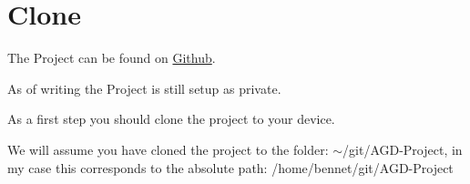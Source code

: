 \section{Clone}
	The Project can be found on \href{https://github.com/BB20101997/AGD-Project}{Github}.
	
	As of writing the Project is still setup as private.
	
	As a first step you should clone the project to your device.
	
	We will assume you have cloned the project to the folder: $\sim$/git/AGD-Project,
	in my case this corresponds to the absolute path: /home/bennet/git/AGD-Project